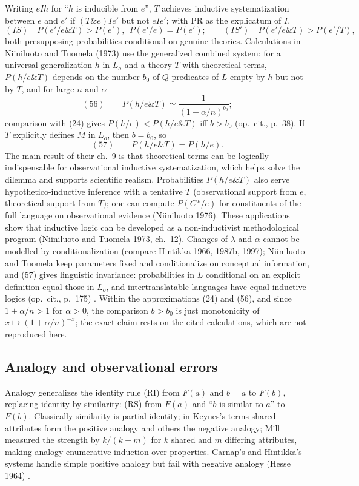 Writing \(eIh\) for ``\(h\) is inducible from \(e\)'', \(T\) achieves
inductive systematization between \(e\) and \(e'\) if \((T\&e)Ie'\) but not
\(eIe'\); with PR as the explicatum of \(I\),
\[
 (IS)\quad P(e'/e\&T)>P(e'),\ \ P(e'/e)=P(e');
 \qquad (IS')\quad P(e'/e\&T)>P(e'/T),
\]
both presupposing probabilities conditional on genuine theories.
Calculations in Niiniluoto and Tuomela (1973) use the generalized combined
system: for a universal generalization \(h\) in \(L_o\) and a theory \(T\)
with theoretical terms, \(P(h/e\&T)\) depends on the number \(b_0\) of
\(Q\)-predicates of \(L\) empty by \(h\) but not by \(T\), and for large \(n\)
and \(\alpha\)
\[
 (56)\qquad P(h/e\&T)\simeq\frac1{(1+\alpha/n)^{b_0}};
\]
comparison with (24) gives \(P(h/e)<P(h/e\&T)\) iff \(b>b_0\) (op.\ cit.,
p.~38). If \(T\) explicitly defines \(M\) in \(L_o\), then \(b=b_0\), so
\[
 (57)\qquad P(h/e\&T)=P(h/e).
\]
The main result of their ch.~9 is that theoretical terms can be logically
indispensable for observational inductive systematization, which helps
solve the dilemma and supports scientific realism. Probabilities
\(P(h/e\&T)\) also serve hypothetico-inductive inference with a tentative
\(T\) (observational support from \(e\), theoretical support from \(T\));
one can compute \(P(C^w/e)\) for constituents of the full language on
observational evidence (Niiniluoto 1976). These applications show that
inductive logic can be developed as a non-inductivist methodological
program (Niiniluoto and Tuomela 1973, ch.~12). Changes of \(\lambda\) and
\(\alpha\) cannot be modelled by conditionalization (compare Hintikka
1966, 1987b, 1997); Niiniluoto and
Tuomela keep parameters fixed and conditionalize on conceptual
information, and (57) gives linguistic invariance: probabilities in \(L\)
conditional on an explicit definition equal those in \(L_o\), and
intertranslatable languages have equal inductive logics (op.\ cit.,
p.~175) \cite[pp.~339--340]{Niiniluoto2011HintikkaProgramReading}. Within
the approximations (24) and (56), and since \(1+\alpha/n>1\) for
\(\alpha>0\), the comparison \(b>b_0\) is just monotonicity of
\(x\mapsto(1+\alpha/n)^{-x}\); the exact claim rests on the cited
calculations, which are not reproduced here.

\subsection{Analogy and observational errors}
\label{sec:p15-w02b-p15-030-nn-analogy}

Analogy generalizes the identity rule (RI) from \(F(a)\) and \(b=a\) to
\(F(b)\), replacing identity by similarity: (RS) from \(F(a)\) and ``\(b\) is
similar to \(a\)'' to \(F(b)\). Classically similarity is partial identity;
in Keynes's terms shared attributes form the positive analogy and others
the negative analogy; Mill measured the strength by \(k/(k+m)\) for \(k\)
shared and \(m\) differing attributes, making analogy enumerative
induction over properties. Carnap's and Hintikka's systems handle simple
positive analogy but fail with negative analogy (Hesse 1964)
\cite[p.~340]{Niiniluoto2011HintikkaProgramReading}.


